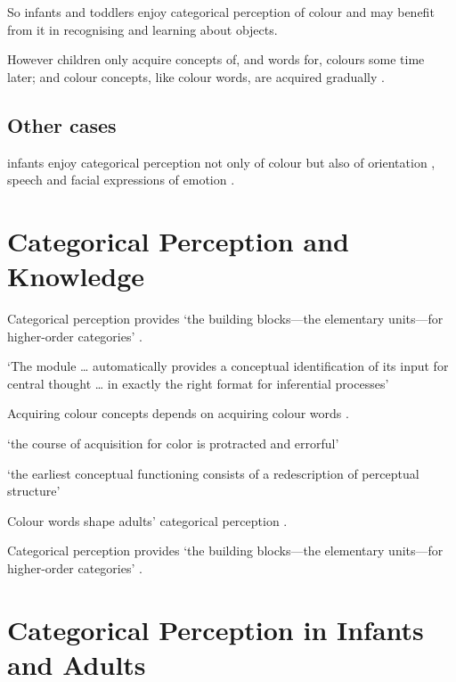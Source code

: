 \documentclass[12pt]{extarticle}
\begin{document}
\begin{multicols}{3}
So infants and toddlers enjoy categorical perception of colour and may benefit from it in recognising and learning about objects.
 
However children only acquire concepts of, and words for, colours some time later; and colour concepts, like colour words, are acquired gradually \citep{Pitchford:2005hm,Kowalski:2006hk,Sandhofer:1999if,Sandhofer:2006qo}.
 
\subsection{Other cases}
 
infants enjoy categorical perception not only of colour but also of orientation \citep{franklin:2010_hemispheric}, speech \citep{Kuhl:1987la,Kuhl:2004nv,Jusczyk:1995it} and facial expressions of emotion \citep{Etcoff:1992zd,Kotsoni:2001ph,Campanella:2002aa}.
 
 
 
\section{Categorical Perception and Knowledge}
 
Categorical perception provides ‘the building blocks—the elementary units—for higher-order categories’
\citep[p.\ 3]{Harnad:1987ej}.
 
‘The module … automatically provides a conceptual identification of its input for central thought … in exactly the right format for inferential processes’
\citep[pp.\ 193--4]{Leslie:1988ct}
 
Acquiring colour concepts depends on acquiring colour words
\citep{Kowalski:2006hk}.
 
‘the course of acquisition for color is protracted and errorful’
\citep{Sandhofer:2006qo}
 
‘the earliest conceptual functioning consists of a redescription of perceptual structure’
\citep{Mandler:1992vn}
 
Colour words shape adults' categorical perception
\citep{Roberson:2007wg,Winawer:2007im}.
 
Categorical perception provides ‘the building blocks—the elementary units—for higher-order categories’
\citep[p.\ 3]{Harnad:1987ej}.
 
 
 
\section{Categorical Perception in Infants and Adults}
 

\end{multicols}
\end{document}
